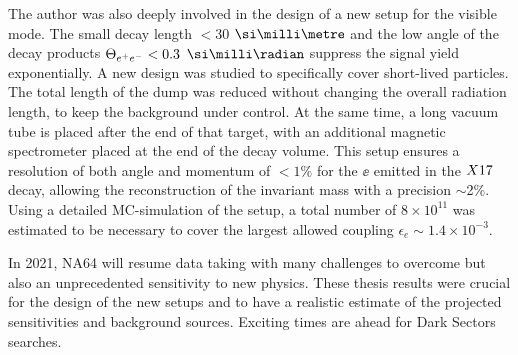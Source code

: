 The author was also deeply involved in the design of a new setup for the visible mode. The small decay length $<$30 $\mmi$ and the low angle of the decay products $\Theta_{ e^+e^-} < 0.3$ $\mrad$ suppress the signal yield exponentially. A new design was studied to specifically cover short-lived particles. The total length of the dump was reduced without changing the overall radiation length, to keep the background under control. At the same time, a long vacuum tube is placed after the end of that target, with an additional magnetic spectrometer placed at the end of the decay volume. This setup ensures a resolution of both angle and momentum of $<1\%$ for the $\ee$ emitted in the $X17$ decay, allowing the reconstruction of the invariant mass with a precision $\sim$2\%. Using a detailed MC-simulation of the setup, a total number of $8 \times 10^{11}$ was estimated to be necessary to cover the largest allowed coupling $\epsilon_e \sim 1.4 \times 10^{-3}$.

In 2021, NA64 will resume data taking with many challenges to overcome but also an unprecedented sensitivity to new physics. These thesis results were crucial for the design of the new setups and to have a realistic estimate of the projected sensitivities and background sources. Exciting times are ahead for Dark Sectors searches.


